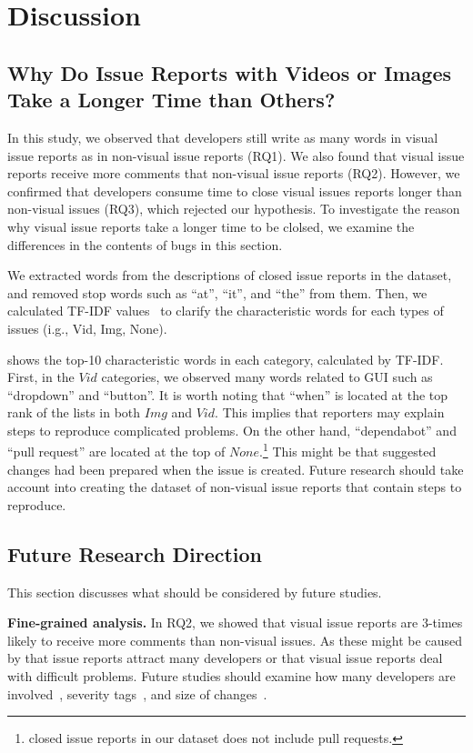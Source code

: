\section{Discussion}
%
\subsection{Why Do Issue Reports with Videos or Images Take a Longer Time than Others?}
In this study, we observed that developers still write as many words in visual issue reports as in non-visual issue reports (RQ1). 
We also found that visual issue reports receive more comments that non-visual issue reports (RQ2). 
However, we confirmed that developers consume time to close visual issues reports longer than non-visual issues (RQ3), which rejected our hypothesis. 
To investigate the reason why visual issue reports take a longer time to be clolsed, we examine the differences in the contents of bugs in this section. 

We extracted words from the descriptions of closed issue reports in the dataset, and  removed stop words such as ``at'', ``it'', and ``the'' from them. 
Then, we calculated TF-IDF values~\citep{salton1988-tfidf} to clarify the characteristic words for each types of issues (i.g., Vid, Img, None). 

 shows the top-10 characteristic words in each category, calculated by TF-IDF.
First, in the $Vid$ categories, we observed many words  related to GUI such as ``dropdown'' and ``button''. It is worth noting that ``when'' is located at the top rank of the lists in both $Img$ and $Vid$. 
This implies that reporters may explain steps to reproduce complicated problems. 
On the other hand, ``dependabot'' and ``pull request'' are located at the top of  $None$.\footnote{closed issue reports in our dataset does not include pull requests.} 
This might be that suggested changes had been prepared when the issue is created. 
Future research should take account into creating the dataset of non-visual issue reports that contain steps to reproduce. 



\subsection{Future Research Direction}
This section discusses what should be considered by future studies. 

\noindent
\textbf{Fine-grained analysis. }
In RQ2, we showed that visual issue reports are 3-times likely to receive more comments than non-visual issues. As these might be caused by that  issue reports attract many developers or that visual issue reports deal with difficult problems. Future studies should examine how many developers are involved~\citep{DBLP:conf/icsm/BavotaR15}, severity tags~\citep{DBLP:conf/issre/ZhouNG15}, and size of changes~\citep{DBLP:conf/kbse/HattoriL08}.

